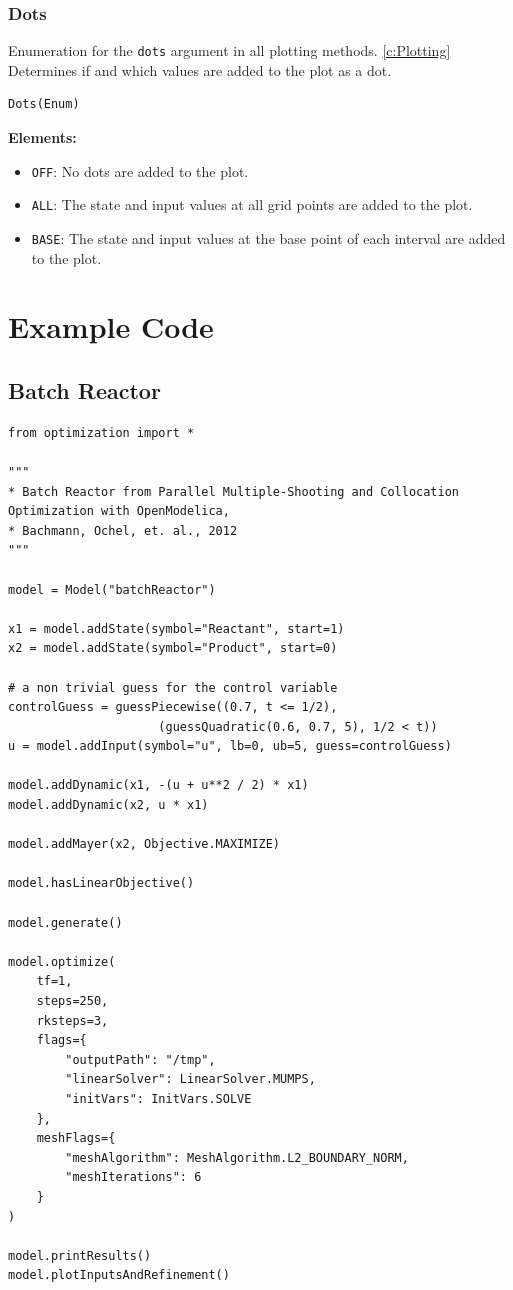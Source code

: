 \documentclass[12pt]{article}
\begin{document}
\subsubsection{Dots}
\label{c:Dots}
\begin{mdframed}[backgroundcolor=gray!10, roundcorner=10pt,
	linewidth=1pt]
	Enumeration for the \texttt{dots} argument in all plotting methods. \ref{c:Plotting} Determines if and which values are added to the plot as a dot. 
	
	\begin{lstlisting}
Dots(Enum)
	\end{lstlisting}
	\label{enum:Dots}
	\textbf{Elements:}
	\begin{itemize}
		\item \texttt{OFF}: No dots are added to the plot.
		\item \texttt{ALL}: The state and input values at all grid points are added to the plot.
		\item \texttt{BASE}: The state and input values at the base point of each interval are added to the plot.
	\end{itemize}
	
\end{mdframed}

\section{Example Code}

\subsection{Batch Reactor}

\begin{lstlisting}
from optimization import *

"""
* Batch Reactor from Parallel Multiple-Shooting and Collocation Optimization with OpenModelica,
* Bachmann, Ochel, et. al., 2012
"""

model = Model("batchReactor")

x1 = model.addState(symbol="Reactant", start=1)
x2 = model.addState(symbol="Product", start=0)

# a non trivial guess for the control variable
controlGuess = guessPiecewise((0.7, t <= 1/2),
			         (guessQuadratic(0.6, 0.7, 5), 1/2 < t))
u = model.addInput(symbol="u", lb=0, ub=5, guess=controlGuess)

model.addDynamic(x1, -(u + u**2 / 2) * x1)
model.addDynamic(x2, u * x1)

model.addMayer(x2, Objective.MAXIMIZE)

model.hasLinearObjective()

model.generate()

model.optimize(
	tf=1,
	steps=250,
	rksteps=3,
	flags={
		"outputPath": "/tmp",
		"linearSolver": LinearSolver.MUMPS,
		"initVars": InitVars.SOLVE
	},
	meshFlags={
		"meshAlgorithm": MeshAlgorithm.L2_BOUNDARY_NORM,
		"meshIterations": 6
	}
)

model.printResults()
model.plotInputsAndRefinement()

\end{lstlisting}
\end{document}
